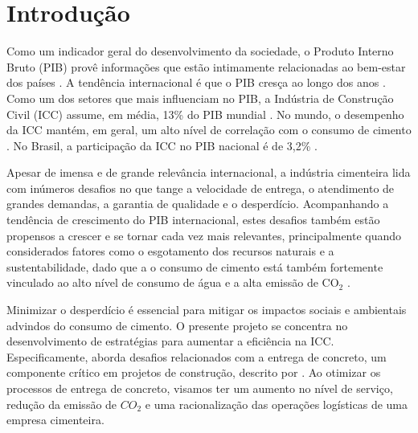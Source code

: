 \chapter{Introdução}
Como um indicador geral do desenvolvimento da sociedade, o Produto Interno Bruto (PIB)  provê informações que estão intimamente relacionadas ao bem-estar dos países \citep{gdpValidity}. A tendência internacional é que o PIB cresça ao longo dos anos \citep{oecd2024realgdp}. Como um dos setores que mais influenciam no PIB, a Indústria de Construção Civil (ICC) assume, em média, 13\% do PIB mundial \citep{mckinsey,fontereserva}.
No mundo, o desempenho da ICC mantém, em geral, um alto nível de correlação com o consumo de cimento \citep{globbulk}. No Brasil, a participação da ICC no PIB nacional é de 3,2\% \citep{SNIC2022}. 

Apesar de imensa e de grande relevância internacional, a indústria cimenteira lida com inúmeros desafios no que tange a velocidade de entrega, o atendimento de grandes demandas, a garantia de qualidade e o desperdício. Acompanhando a tendência de crescimento do PIB internacional, estes desafios também estão propensos a crescer e se tornar cada vez mais relevantes, principalmente quando considerados fatores como o esgotamento dos recursos naturais e a sustentabilidade, dado que a o consumo de cimento está também fortemente vinculado ao alto nível de consumo de água e a alta emissão de CO$_2$ \citep{Watts2019Concrete}.

Minimizar o desperdício é essencial para mitigar os impactos sociais e ambientais advindos do consumo de cimento. O presente projeto se concentra no desenvolvimento de estratégias para aumentar a eficiência na ICC. Especificamente, aborda desafios relacionados com a entrega de concreto, um componente crítico em projetos de construção, descrito por \cite{tabref9}. Ao otimizar os processos de entrega de concreto, 
visamos ter um aumento no nível de serviço, redução
da emissão de $CO_2$ e uma racionalização das operações logísticas
de uma empresa cimenteira.


